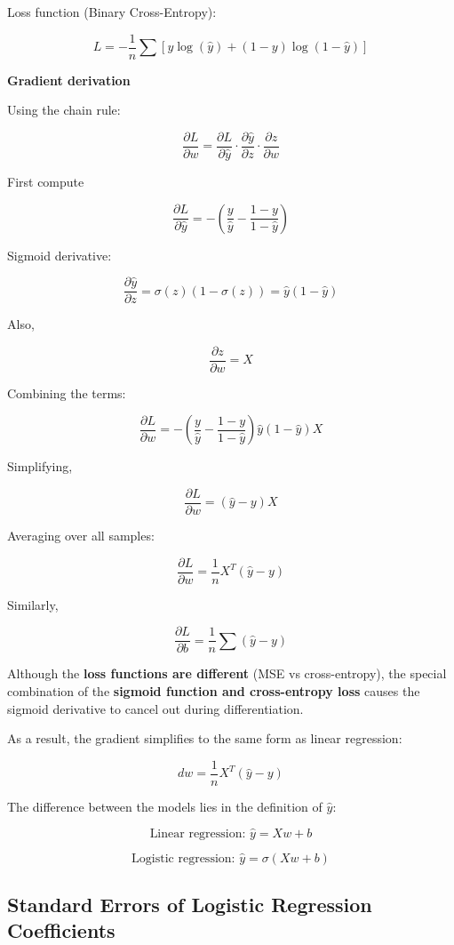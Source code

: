 \documentclass[10pt,a4paper]{article}
\begin{document}
	Loss function (Binary Cross-Entropy):

	\[
	L =
	-\frac{1}{n}\sum
	\left[
	y\log(\hat{y}) + (1-y)\log(1-\hat{y})
	\right]
	\]

	\textbf{Gradient derivation}

	Using the chain rule:

	\[
	\frac{\partial L}{\partial w}
	=
	\frac{\partial L}{\partial \hat{y}}
	\cdot
	\frac{\partial \hat{y}}{\partial z}
	\cdot
	\frac{\partial z}{\partial w}
	\]

	First compute

	\[
	\frac{\partial L}{\partial \hat{y}}
	=
	-\left(\frac{y}{\hat{y}} - \frac{1-y}{1-\hat{y}}\right)
	\]

	Sigmoid derivative:

	\[
	\frac{\partial \hat{y}}{\partial z}
	=
	\sigma(z)(1-\sigma(z))
	=
	\hat{y}(1-\hat{y})
	\]

	Also,

	\[
	\frac{\partial z}{\partial w} = X
	\]

	Combining the terms:

	\[
	\frac{\partial L}{\partial w}
	=
	-\left(\frac{y}{\hat{y}} - \frac{1-y}{1-\hat{y}}\right)
	\hat{y}(1-\hat{y})X
	\]

	Simplifying,

	\[
	\frac{\partial L}{\partial w}
	=
	(\hat{y}-y)X
	\]

	Averaging over all samples:

	\[
	\frac{\partial L}{\partial w}
	=
	\frac{1}{n}X^T(\hat{y}-y)
	\]

	Similarly,

	\[
	\frac{\partial L}{\partial b}
	=
	\frac{1}{n}\sum(\hat{y}-y)
	\]


	Although the \textbf{loss functions are different} (MSE vs cross-entropy), the special combination of the \textbf{sigmoid function and cross-entropy loss} causes the sigmoid derivative to cancel out during differentiation.

	As a result, the gradient simplifies to the same form as linear regression:

	\[
	dw = \frac{1}{n}X^T(\hat{y}-y)
	\]

	The difference between the models lies in the definition of $\hat{y}$:

	\[
	\text{Linear regression: } \hat{y} = Xw + b
	\]

	\[
	\text{Logistic regression: } \hat{y} = \sigma(Xw+b)
	\]
	
	\subsection{Standard Errors of Logistic Regression Coefficients}
	
\end{document}
